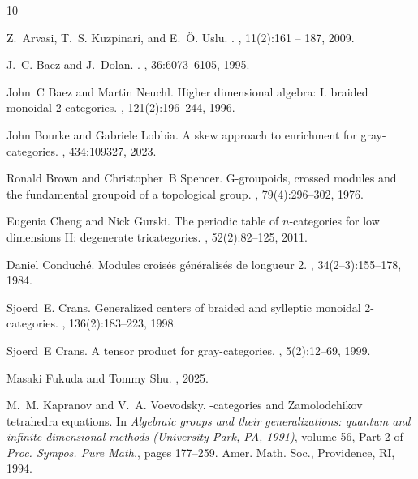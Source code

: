 \documentclass[11pt, reqno]{amsart} %
\theoremstyle{definition}
\theoremstyle{remark}
\numberwithin{equation}{section}
\begin{document}
\begin{thebibliography}{10}

Z.~Arvasi, T.~S. Kuzpinari, and E.~{\"O}. Uslu.
.
, 11(2):161 -- 187, 2009.

J.~C. Baez and J.~Dolan.
.
, 36:6073--6105, 1995.

John~C Baez and Martin Neuchl.
\newblock Higher dimensional algebra: I. braided monoidal 2-categories.
, 121(2):196--244, 1996.

John Bourke and Gabriele Lobbia.
\newblock A skew approach to enrichment for gray-categories.
, 434:109327, 2023.

Ronald Brown and Christopher~B Spencer.
\newblock G-groupoids, crossed modules and the fundamental groupoid of a topological group.
, 79(4):296--302, 1976.

Eugenia Cheng and Nick Gurski.
\newblock The periodic table of $n$-categories for low dimensions {II}: degenerate tricategories.
, 52(2):82--125, 2011.

Daniel Conduch{\'e}.
\newblock Modules crois{\'e}s g{\'e}n{\'e}ralis{\'e}s de longueur 2.
, 34(2--3):155--178, 1984.

Sjoerd~E. Crans.
\newblock Generalized centers of braided and sylleptic monoidal 2-categories.
, 136(2):183--223, 1998.

Sjoerd~E Crans.
\newblock A tensor product for gray-categories.
, 5(2):12--69, 1999.

Masaki Fukuda and Tommy Shu.
, 2025.

M.~M. Kapranov and V.~A. Voevodsky.
-categories and {Z}amolodchikov tetrahedra equations.
\newblock In {\em Algebraic groups and their generalizations: quantum and infinite-dimensional methods ({U}niversity {P}ark, {PA}, 1991)}, volume 56, Part 2 of {\em Proc. Sympos. Pure Math.}, pages 177--259. Amer. Math. Soc., Providence, RI, 1994.


\end{thebibliography}
\end{document}

